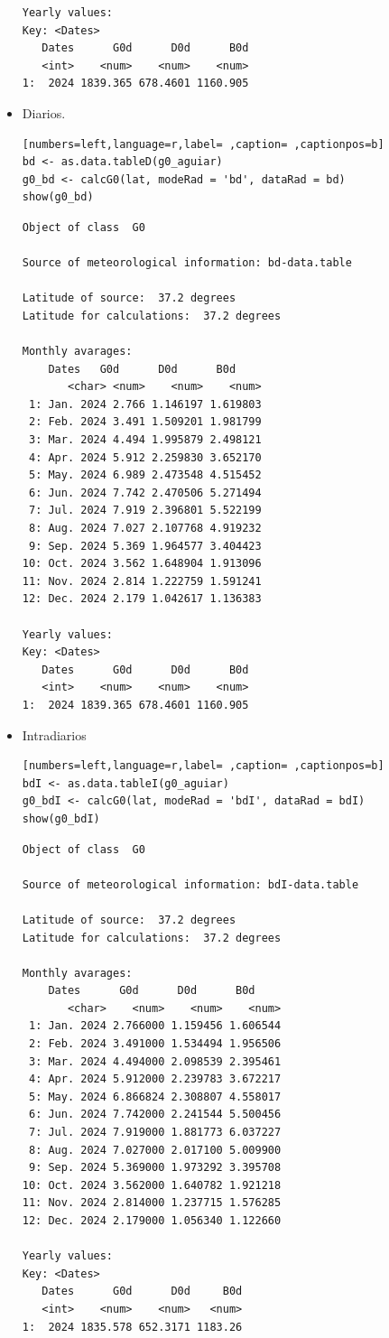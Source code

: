 \begin{itemize}
\begin{verbatim}
Yearly values:
Key: <Dates>
   Dates      G0d      D0d      B0d
   <int>    <num>    <num>    <num>
1:  2024 1839.365 678.4601 1160.905
\end{verbatim}

\item Diarios.
\begin{lstlisting}[numbers=left,language=r,label= ,caption= ,captionpos=b]
bd <- as.data.tableD(g0_aguiar)
g0_bd <- calcG0(lat, modeRad = 'bd', dataRad = bd)
show(g0_bd)
\end{lstlisting}

\begin{verbatim}
Object of class  G0 

Source of meteorological information: bd-data.table 

Latitude of source:  37.2 degrees
Latitude for calculations:  37.2 degrees

Monthly avarages:
	Dates   G0d      D0d      B0d
       <char> <num>    <num>    <num>
 1: Jan. 2024 2.766 1.146197 1.619803
 2: Feb. 2024 3.491 1.509201 1.981799
 3: Mar. 2024 4.494 1.995879 2.498121
 4: Apr. 2024 5.912 2.259830 3.652170
 5: May. 2024 6.989 2.473548 4.515452
 6: Jun. 2024 7.742 2.470506 5.271494
 7: Jul. 2024 7.919 2.396801 5.522199
 8: Aug. 2024 7.027 2.107768 4.919232
 9: Sep. 2024 5.369 1.964577 3.404423
10: Oct. 2024 3.562 1.648904 1.913096
11: Nov. 2024 2.814 1.222759 1.591241
12: Dec. 2024 2.179 1.042617 1.136383

Yearly values:
Key: <Dates>
   Dates      G0d      D0d      B0d
   <int>    <num>    <num>    <num>
1:  2024 1839.365 678.4601 1160.905
\end{verbatim}

\item Intradiarios
\begin{lstlisting}[numbers=left,language=r,label= ,caption= ,captionpos=b]
bdI <- as.data.tableI(g0_aguiar)
g0_bdI <- calcG0(lat, modeRad = 'bdI', dataRad = bdI)
show(g0_bdI)
\end{lstlisting}

\begin{verbatim}
Object of class  G0 

Source of meteorological information: bdI-data.table 

Latitude of source:  37.2 degrees
Latitude for calculations:  37.2 degrees

Monthly avarages:
	Dates      G0d      D0d      B0d
       <char>    <num>    <num>    <num>
 1: Jan. 2024 2.766000 1.159456 1.606544
 2: Feb. 2024 3.491000 1.534494 1.956506
 3: Mar. 2024 4.494000 2.098539 2.395461
 4: Apr. 2024 5.912000 2.239783 3.672217
 5: May. 2024 6.866824 2.308807 4.558017
 6: Jun. 2024 7.742000 2.241544 5.500456
 7: Jul. 2024 7.919000 1.881773 6.037227
 8: Aug. 2024 7.027000 2.017100 5.009900
 9: Sep. 2024 5.369000 1.973292 3.395708
10: Oct. 2024 3.562000 1.640782 1.921218
11: Nov. 2024 2.814000 1.237715 1.576285
12: Dec. 2024 2.179000 1.056340 1.122660

Yearly values:
Key: <Dates>
   Dates      G0d      D0d     B0d
   <int>    <num>    <num>   <num>
1:  2024 1835.578 652.3171 1183.26
\end{verbatim}
\end{itemize}

